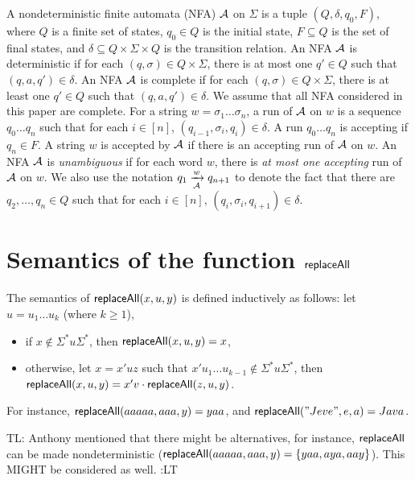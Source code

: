 \documentclass{llncs}
\newcommand{\tl}[1]{\color{blue} {TL: #1 :LT} \color{black}}
\begin{document}
A nondeterministic finite automata (NFA) $\mathcal{A}$ on $\Sigma$ is a tuple $(Q, \delta, q_0, F)$, where $Q$ is a finite set of states, $q_0 \in Q$ is the initial state, $F \subseteq Q$ is the set of final states, and $\delta \subseteq Q \times \Sigma \times Q$ is the transition relation. An NFA $\mathcal{A}$ is deterministic if for each $(q, \sigma) \in Q \times \Sigma$, there is at most one $q' \in Q$ such that $(q, a, q') \in \delta$. An NFA $\mathcal{A}$ is complete if for each $(q, \sigma) \in Q \times \Sigma$, there is at least one $q' \in Q$ such that $(q, a, q') \in \delta$. We assume that all NFA considered in this paper are complete. For a string $w = \sigma_1 \dots \sigma_n$, a run of $\mathcal{A}$ on $w$ is a sequence $q_0 \dots q_n$ such that for each $i \in [n]$, $(q_{i-1}, \sigma_i, q_i) \in \delta$. A run $q_0 \dots q_n$ is accepting if $q_n \in F$. A string $w$ is accepted by $\mathcal{A}$ if there is an accepting run of $\mathcal{A}$ on $w$. An NFA $\mathcal{A}$ is \emph{unambiguous} if for each word $w$, there is \emph{at most one accepting} run of $\mathcal{A}$ on $w$.
We also use the notation $q_1 \xrightarrow[\mathcal{A}]{w} q_{n+1}$ to denote the fact that there are $q_2,\dots, q_n \in Q$ such that for each $i \in [n]$, $(q_i, \sigma_i, q_{i+1}) \in \delta$.  


\section{Semantics of the function $\mathsf{replaceAll}$}

The semantics of $\mathsf{replaceAll}(x, u, y)$ is defined inductively as follows: let $u = u_1 \dots u_k$ (where $k \ge 1$),
\begin{itemize}
\item if $x \not \in \Sigma^\ast u \Sigma^\ast$, then $\mathsf{replaceAll}(x, u, y) = x$, 
%
\item otherwise, let $x = x' u z$ such that $x' u_1 \dots u_{k-1} \not \in \Sigma^\ast u \Sigma^\ast$, then $\mathsf{replaceAll}(x, u, y) = x' v \cdot \mathsf{replaceAll}(z, u, y)$.
\end{itemize}
For instance, $\mathsf{replaceAll}(aaaaa, aaa, y) = yaa$, and $\mathsf{replaceAll}("Jeve", e, a) = Java$.

\tl{Anthony mentioned that there might be alternatives, for instance,  $\mathsf{replaceAll}$ can be made nondeterministic ($\mathsf{replaceAll}(aaaaa, aaa, y) = \{yaa, aya, aay\}$). This MIGHT be considered as well.}
\end{document}
